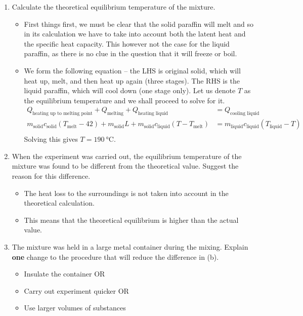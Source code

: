 \documentclass[a4paper,12pt]{article}
\begin{document}
\begin{enumerate}[label=(\alph*)]
  \item Calculate the theoretical equilibrium temperature of the mixture.
        \begin{itemize}
          \item First things first, we must be clear that the solid paraffin will melt and so in its calculation we have to take into account both the latent heat and the specific heat capacity. This however not the case for the liquid paraffin, as there is no clue in the question that it will freeze or boil.
          \item We form the following equation -- the LHS is original solid, which will heat up, melt, and then heat up again (three stages). The RHS is the liquid paraffin, which will cool down (one stage only). Let us denote $T$ as the equilibrium temperature and we shall proceed to solve for it.
                \begin{align*}
                  Q_{\text{heating up to melting point}} + Q_{\text{melting}} + Q_{\text{heating liquid}}                               & = Q_{\text{cooling liquid}}                           \\
                  m_\text{solid}c_\text{solid}(T_\text{melt} - 42) + m_\text{solid}L + m_\text{solid}c_\text{liquid}(T - T_\text{melt}) & = m_\text{liquid}c_\text{liquid}(T_\text{liquid} - T) \\
                \end{align*}
                Solving this gives $T = \SI{190}{\degreeCelsius}$.
        \end{itemize}
  \item When the experiment was carried out, the equilibrium temperature of the mixture was found to be different from the theoretical value. Suggest the reason for this difference.
        \begin{itemize}
          \item The heat loss to the surroundings is not taken into account in the theoretical calculation.
          \item This means that the theoretical equilibrium is higher than the actual value.
        \end{itemize}
  \item The mixture was held in a large metal container during the mixing. Explain \textbf{one} change to the procedure that will reduce the difference in (b).
        \begin{itemize}
          \item Insulate the container OR
          \item Carry out experiment quicker OR
          \item Use larger volumes of substances
        \end{itemize}
\end{enumerate}
\end{document}
